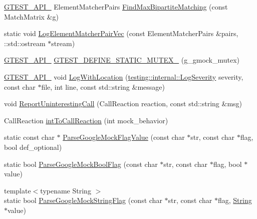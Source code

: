 \begin{DoxyCompactItemize}
\item 
\mbox{\hyperlink{gtest-port_8h_aa73be6f0ba4a7456180a94904ce17790}{G\+T\+E\+S\+T\+\_\+\+A\+P\+I\+\_\+}} Element\+Matcher\+Pairs \mbox{\hyperlink{namespacetesting_1_1internal_ae30bd8357c179334b2b09b0d689efccc}{Find\+Max\+Bipartite\+Matching}} (const Match\+Matrix \&g)
\item 
static void \mbox{\hyperlink{namespacetesting_1_1internal_a7e3ffe5f66db16c3ab89de55eac65bfa}{Log\+Element\+Matcher\+Pair\+Vec}} (const Element\+Matcher\+Pairs \&pairs, \+::std\+::ostream $\ast$stream)
\item 
\mbox{\hyperlink{gtest-port_8h_aa73be6f0ba4a7456180a94904ce17790}{G\+T\+E\+S\+T\+\_\+\+A\+P\+I\+\_\+}} \mbox{\hyperlink{namespacetesting_1_1internal_a8c4aa7be8daa7b60e293071d70a89584}{G\+T\+E\+S\+T\+\_\+\+D\+E\+F\+I\+N\+E\+\_\+\+S\+T\+A\+T\+I\+C\+\_\+\+M\+U\+T\+E\+X\+\_\+}} (g\+\_\+gmock\+\_\+mutex)
\item 
\mbox{\hyperlink{gtest-port_8h_aa73be6f0ba4a7456180a94904ce17790}{G\+T\+E\+S\+T\+\_\+\+A\+P\+I\+\_\+}} void \mbox{\hyperlink{namespacetesting_1_1internal_a07f4411f23f8b1b731858be9dda3fdcc}{Log\+With\+Location}} (\mbox{\hyperlink{namespacetesting_1_1internal_a203d1a8a2147a53d12bbdae40d443914}{testing\+::internal\+::\+Log\+Severity}} severity, const char $\ast$file, int line, const std\+::string \&message)
\item 
void \mbox{\hyperlink{namespacetesting_1_1internal_af045b703d8487374620a8106a76814ee}{Report\+Uninteresting\+Call}} (Call\+Reaction reaction, const std\+::string \&msg)
\item 
Call\+Reaction \mbox{\hyperlink{namespacetesting_1_1internal_a55ce2ee38c64db1a89feae3751439620}{int\+To\+Call\+Reaction}} (int mock\+\_\+behavior)
\item 
static const char $\ast$ \mbox{\hyperlink{namespacetesting_1_1internal_af9eac3bda47b1fa0b8e43d1d1d3a0b16}{Parse\+Google\+Mock\+Flag\+Value}} (const char $\ast$str, const char $\ast$flag, bool def\+\_\+optional)
\item 
static bool \mbox{\hyperlink{namespacetesting_1_1internal_a137bff8177d6158f59ab4ce603577293}{Parse\+Google\+Mock\+Bool\+Flag}} (const char $\ast$str, const char $\ast$flag, bool $\ast$value)
\item 
{\footnotesize template$<$typename String $>$ }\\static bool \mbox{\hyperlink{namespacetesting_1_1internal_afb359266feb817d9943854b76574817d}{Parse\+Google\+Mock\+String\+Flag}} (const char $\ast$str, const char $\ast$flag, \mbox{\hyperlink{classtesting_1_1internal_1_1String}{String}} $\ast$value)

\end{DoxyCompactItemize}
